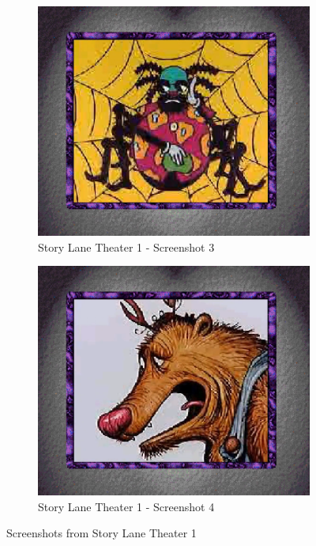 \begin{figure}[H]
    \begin{subfigure}{0.45\textwidth}
        \centering
        \includegraphics[width=\linewidth]{Games/StoryLaneTheater/Images/StoryLaneTheater1Image3.png}
        \caption{Story Lane Theater 1 - Screenshot 3}
    \end{subfigure}
    \begin{subfigure}{0.45\textwidth}
        \centering
        \includegraphics[width=\linewidth]{Games/StoryLaneTheater/Images/StoryLaneTheater1Image4.png}
        \caption{Story Lane Theater 1 - Screenshot 4}
    \end{subfigure}
    \caption{Screenshots from Story Lane Theater 1}
\end{figure}
